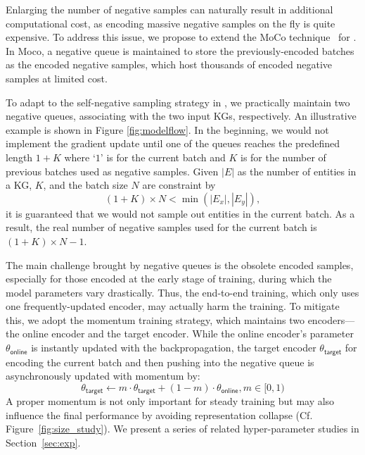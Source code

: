 Enlarging the number of negative samples can naturally result in additional computational cost, as  encoding massive negative samples on the fly is quite expensive. 
To address this issue, we propose to extend the MoCo technique~\cite{he2020momentum} for \solution. 
In Moco, a negative queue is maintained to store the previously-encoded batches as the encoded negative samples, which host thousands of encoded negative samples at limited cost. 

To adapt to the self-negative sampling strategy in \solution, we practically maintain two negative queues, associating with the two input KGs, respectively. 
An illustrative example is shown in Figure \ref{fig:modelflow}. 
In the beginning, we would not implement the gradient update until one of the queues reaches the predefined length $1+K$ where `$1$' is for the current batch and $K$ is for the number of previous batches used as negative samples. 
Given $|E|$ as the number of entities in a KG, $K$, and the batch size $N$ are constraint by
\begin{equation}
    (1+K)\times N< \min(|E_x|,|E_y|), 
\end{equation}
it is guaranteed that we would not sample out entities in the current batch. 
As a result, the real number of negative samples used for the current batch is $(1 + K)\times N - 1$.



The main challenge brought by negative queues is the obsolete encoded samples, especially for those encoded at the early stage of training, during which the model parameters vary drastically. 
Thus, the end-to-end training, which only uses one frequently-updated encoder, may actually harm the training. 
To mitigate this, we adopt the momentum training strategy, which maintains two encoders---the online encoder and the target encoder. 
While the online encoder's parameter $\theta_\mathsf{online}$ is instantly updated with the backpropagation, the target encoder $\theta_\mathsf{target}$ for encoding the current batch and then pushing into the negative queue is asynchronously updated with momentum by:
\begin{equation}
\label{eq:momentum}
    \theta_\mathsf{target} \gets m\cdot\theta_\mathsf{target} + (1-m)\cdot\theta_\mathsf{online}, m\in [0,1)
\end{equation}
A proper momentum is not only important for steady training but may also influence the final performance by avoiding representation collapse (Cf. Figure~\ref{fig:size_study}). We present a series of related hyper-parameter studies in Section~\ref{sec:exp}.



